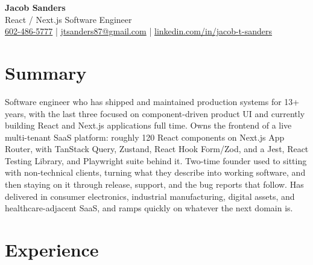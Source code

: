\documentclass[10.5pt, letterpaper]{article}
\begin{document}
\begin{center}
  {\fontsize{28}{32}\selectfont\bfseries\color{accent} Jacob Sanders}\\[5pt]
  {\large\color{muted} React / Next.js Software Engineer}\\[8pt]
  \small
  \faPhone\enspace \href{tel:6024865777}{602-486-5777}
  \enspace\textcolor{accent}{|}\enspace
  \faEnvelope\enspace \href{mailto:jtsanders87@gmail.com}{jtsanders87@gmail.com}
  \enspace\textcolor{accent}{|}\enspace
  \faLinkedin\enspace \href{https://linkedin.com/in/jacob-t-sanders}{linkedin.com/in/jacob-t-sanders}
\end{center}

\vspace{2pt}

\section{Summary}

Software engineer who has shipped and maintained production systems for 13+
years, with the last three focused on component-driven product UI and currently
building React and Next.js applications full time. Owns the frontend of a live
multi-tenant SaaS platform: roughly 120 React components on Next.js App Router,
with TanStack Query, Zustand, React Hook Form/Zod, and a Jest, React Testing
Library, and Playwright suite behind it. Two-time founder used to sitting with
non-technical clients, turning what they describe into working software, and
then staying on it through release, support, and the bug reports that follow.
Has delivered in consumer electronics, industrial manufacturing, digital assets,
and healthcare-adjacent SaaS, and ramps quickly on whatever the next domain is.

\section{Experience}
\end{document}
